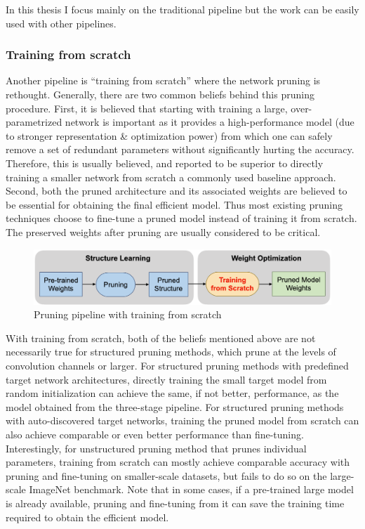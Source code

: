 In this thesis I focus mainly on the traditional pipeline but the work can be
easily used with other pipelines.

\subsubsection{Training from scratch}
Another pipeline is ``training from scratch'' where the network pruning is
rethought.
Generally, there are two common beliefs behind this pruning procedure. First,
it is believed that starting with training a large, over-parametrized network
is important as it provides a high-performance model (due to stronger
representation \& optimization power) from which one can safely remove a set of
redundant parameters without significantly hurting the accuracy. Therefore,
this is usually believed, and reported to be superior to directly training a
smaller network from scratch \- a commonly used baseline approach.
Second, both the pruned architecture and its associated weights are believed to
be essential for obtaining the final efficient model. Thus most existing
pruning techniques choose to fine-tune a pruned model instead of training it
from scratch. The preserved weights after pruning are usually considered to be
critical.

\begin{figure}[ht]
    \includegraphics[width=\textwidth]{images/pruning/liu_pipeline.png}
    \centering
    \caption{Pruning pipeline with training from scratch}\label{fig:liu_pipeline}
\end{figure}

With training from scratch, both of the beliefs mentioned above are not
necessarily true for structured pruning methods, which prune at the levels of
convolution channels or larger.
For structured pruning methods with predefined target network architectures,
directly training the small target model from random initialization can achieve
the same, if not better, performance, as the model obtained from the
three-stage pipeline.
For structured pruning methods with auto-discovered target networks, training
the pruned model from scratch can also achieve comparable or even better
performance than fine-tuning.
Interestingly, for unstructured pruning method that prunes individual
parameters, training from scratch can mostly achieve comparable accuracy with
pruning and fine-tuning on smaller-scale datasets, but fails to do so on the
large-scale ImageNet benchmark.
Note that in some cases, if a pre-trained large model is already available,
pruning and fine-tuning from it can save the training time required to obtain
the efficient model.~\cite{liu2018rethinking}

